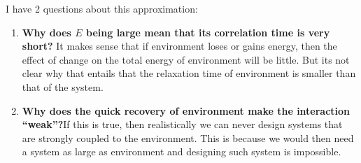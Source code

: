 \documentclass{article}
\begin{document}
I have 2 questions about this approximation:
\begin{enumerate}
 \item \textbf{Why does $E$ being large mean that its correlation time is very short?} It makes sense that if environment loses or gains energy, then the effect of change on the total energy of environment will be little. But its not clear why that entails that the relaxation time of environment is smaller than that of the system.
 \item \textbf{Why does the quick recovery of environment make the interaction ``weak''?}If this is true, then realistically we can never design systems that are strongly coupled to the environment. This is because we would then need a system as large as environment and designing such system is impossible.
\end{enumerate}
\end{document}
